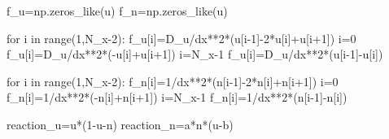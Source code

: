 \documentclass[
  letterpaper,
  DIV=11,
  numbers=noendperiod]{scrreprt}
\newenvironment{Shaded}{\begin{snugshade}}{\end{snugshade}}
\newcommand{\BuiltInTok}[1]{\textcolor[rgb]{0.00,0.23,0.31}{#1}}
\newcommand{\ControlFlowTok}[1]{\textcolor[rgb]{0.00,0.23,0.31}{#1}}
\newcommand{\DecValTok}[1]{\textcolor[rgb]{0.68,0.00,0.00}{#1}}
\newcommand{\KeywordTok}[1]{\textcolor[rgb]{0.00,0.23,0.31}{#1}}
\newcommand{\NormalTok}[1]{\textcolor[rgb]{0.00,0.23,0.31}{#1}}
\newcommand{\OperatorTok}[1]{\textcolor[rgb]{0.37,0.37,0.37}{#1}}
\theoremstyle{plain}
\theoremstyle{definition}
\theoremstyle{plain}
\theoremstyle{remark}
\begin{document}
\begin{Shaded}
\begin{Highlighting}[]
\NormalTok{    f\_u}\OperatorTok{=}\NormalTok{np.zeros\_like(u)}
\NormalTok{    f\_n}\OperatorTok{=}\NormalTok{np.zeros\_like(u)}

    \ControlFlowTok{for}\NormalTok{ i }\KeywordTok{in} \BuiltInTok{range}\NormalTok{(}\DecValTok{1}\NormalTok{,N\_x}\OperatorTok{{-}}\DecValTok{2}\NormalTok{):}
\NormalTok{      f\_u[i]}\OperatorTok{=}\NormalTok{D\_u}\OperatorTok{/}\NormalTok{dx}\OperatorTok{**}\DecValTok{2}\OperatorTok{*}\NormalTok{(u[i}\OperatorTok{{-}}\DecValTok{1}\NormalTok{]}\OperatorTok{{-}}\DecValTok{2}\OperatorTok{*}\NormalTok{u[i]}\OperatorTok{+}\NormalTok{u[i}\OperatorTok{+}\DecValTok{1}\NormalTok{]) }
\NormalTok{    i}\OperatorTok{=}\DecValTok{0}
\NormalTok{    f\_u[i]}\OperatorTok{=}\NormalTok{D\_u}\OperatorTok{/}\NormalTok{dx}\OperatorTok{**}\DecValTok{2}\OperatorTok{*}\NormalTok{(}\OperatorTok{{-}}\NormalTok{u[i]}\OperatorTok{+}\NormalTok{u[i}\OperatorTok{+}\DecValTok{1}\NormalTok{]) }
\NormalTok{    i}\OperatorTok{=}\NormalTok{N\_x}\OperatorTok{{-}}\DecValTok{1}
\NormalTok{    f\_u[i]}\OperatorTok{=}\NormalTok{D\_u}\OperatorTok{/}\NormalTok{dx}\OperatorTok{**}\DecValTok{2}\OperatorTok{*}\NormalTok{(u[i}\OperatorTok{{-}}\DecValTok{1}\NormalTok{]}\OperatorTok{{-}}\NormalTok{u[i])}

    \ControlFlowTok{for}\NormalTok{ i }\KeywordTok{in} \BuiltInTok{range}\NormalTok{(}\DecValTok{1}\NormalTok{,N\_x}\OperatorTok{{-}}\DecValTok{2}\NormalTok{):}
\NormalTok{      f\_n[i]}\OperatorTok{=}\DecValTok{1}\OperatorTok{/}\NormalTok{dx}\OperatorTok{**}\DecValTok{2}\OperatorTok{*}\NormalTok{(n[i}\OperatorTok{{-}}\DecValTok{1}\NormalTok{]}\OperatorTok{{-}}\DecValTok{2}\OperatorTok{*}\NormalTok{n[i]}\OperatorTok{+}\NormalTok{n[i}\OperatorTok{+}\DecValTok{1}\NormalTok{]) }
\NormalTok{    i}\OperatorTok{=}\DecValTok{0}
\NormalTok{    f\_n[i]}\OperatorTok{=}\DecValTok{1}\OperatorTok{/}\NormalTok{dx}\OperatorTok{**}\DecValTok{2}\OperatorTok{*}\NormalTok{(}\OperatorTok{{-}}\NormalTok{n[i]}\OperatorTok{+}\NormalTok{n[i}\OperatorTok{+}\DecValTok{1}\NormalTok{]) }
\NormalTok{    i}\OperatorTok{=}\NormalTok{N\_x}\OperatorTok{{-}}\DecValTok{1}
\NormalTok{    f\_n[i]}\OperatorTok{=}\DecValTok{1}\OperatorTok{/}\NormalTok{dx}\OperatorTok{**}\DecValTok{2}\OperatorTok{*}\NormalTok{(n[i}\OperatorTok{{-}}\DecValTok{1}\NormalTok{]}\OperatorTok{{-}}\NormalTok{n[i])}

\NormalTok{    reaction\_u}\OperatorTok{=}\NormalTok{u}\OperatorTok{*}\NormalTok{(}\DecValTok{1}\OperatorTok{{-}}\NormalTok{u}\OperatorTok{{-}}\NormalTok{n)}
\NormalTok{    reaction\_n}\OperatorTok{=}\NormalTok{a}\OperatorTok{*}\NormalTok{n}\OperatorTok{*}\NormalTok{(u}\OperatorTok{{-}}\NormalTok{b)}


\end{Highlighting}
\end{Shaded}
\end{document}
